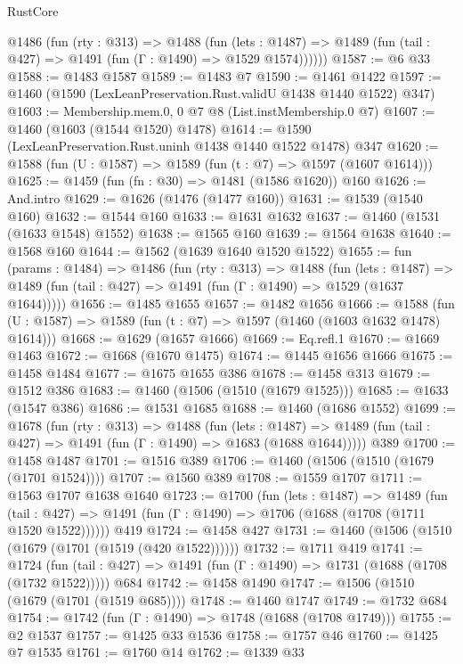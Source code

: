 \begin{lexlean}{RustCore}
\begin{coremodule}
      @1486
        (fun (rty : @313) =>
        @1488
          (fun (lets : @1487) =>
          @1489 (fun (tail : @427) => @1491 (fun (Γ : @1490) => @1529 @1574))))))
@1587 := @6 @33
@1588 := @1483 @1587
@1589 := @1483 @7
@1590 := @1461 @1422
@1597 := @1460 (@1590 (LexLeanPreservation.Rust.validU @1438 @1440 @1522) @347)
@1603 := Membership.mem.{0, 0} @7 @8 (List.instMembership.{0} @7)
@1607 := @1460 (@1603 (@1544 @1520) @1478)
@1614 := @1590 (LexLeanPreservation.Rust.uninh @1438 @1440 @1522 @1478) @347
@1620 := @1588 (fun (U : @1587) => @1589 (fun (t : @7) => @1597 (@1607 @1614)))
@1625 := @1459 (fun (fn : @30) => @1481 (@1586 @1620)) @160
@1626 := And.intro
@1629 := @1626 (@1476 (@1477 @160))
@1631 := @1539 (@1540 @160)
@1632 := @1544 @160
@1633 := @1631 @1632
@1637 := @1460 (@1531 (@1633 @1548) @1552)
@1638 := @1565 @160
@1639 := @1564 @1638
@1640 := @1568 @160
@1644 := @1562 (@1639 @1640 @1520 @1522)
@1655 := fun (params : @1484) =>
  @1486
    (fun (rty : @313) =>
    @1488
      (fun (lets : @1487) =>
      @1489 (fun (tail : @427) => @1491 (fun (Γ : @1490) => @1529 (@1637 @1644)))))
@1656 := @1485 @1655
@1657 := @1482 @1656
@1666 := @1588 (fun (U : @1587) => @1589 (fun (t : @7) => @1597 (@1460 (@1603 @1632 @1478) @1614)))
@1668 := @1629 (@1657 @1666)
@1669 := Eq.refl.{1}
@1670 := @1669 @1463
@1672 := @1668 (@1670 @1475)
@1674 := @1445 @1656 @1666
@1675 := @1458 @1484
@1677 := @1675 @1655 @386
@1678 := @1458 @313
@1679 := @1512 @386
@1683 := @1460 (@1506 (@1510 (@1679 @1525)))
@1685 := @1633 (@1547 @386)
@1686 := @1531 @1685
@1688 := @1460 (@1686 @1552)
@1699 := @1678
    (fun (rty : @313) =>
    @1488
      (fun (lets : @1487) =>
      @1489 (fun (tail : @427) => @1491 (fun (Γ : @1490) => @1683 (@1688 @1644)))))
    @389
@1700 := @1458 @1487
@1701 := @1516 @389
@1706 := @1460 (@1506 (@1510 (@1679 (@1701 @1524))))
@1707 := @1560 @389
@1708 := @1559 @1707
@1711 := @1563 @1707 @1638 @1640
@1723 := @1700
    (fun (lets : @1487) =>
    @1489
      (fun (tail : @427) => @1491 (fun (Γ : @1490) => @1706 (@1688 (@1708 (@1711 @1520 @1522))))))
    @419
@1724 := @1458 @427
@1731 := @1460 (@1506 (@1510 (@1679 (@1701 (@1519 (@420 @1522))))))
@1732 := @1711 @419
@1741 := @1724
    (fun (tail : @427) => @1491 (fun (Γ : @1490) => @1731 (@1688 (@1708 (@1732 @1522)))))
    @684
@1742 := @1458 @1490
@1747 := @1506 (@1510 (@1679 (@1701 (@1519 @685))))
@1748 := @1460 @1747
@1749 := @1732 @684
@1754 := @1742 (fun (Γ : @1490) => @1748 (@1688 (@1708 @1749)))
@1755 := @2 @1537
@1757 := @1425 @33 @1536
@1758 := @1757 @46
@1760 := @1425 @7 @1535
@1761 := @1760 @14
@1762 := @1339 @33

\end{coremodule}
\end{lexlean}

